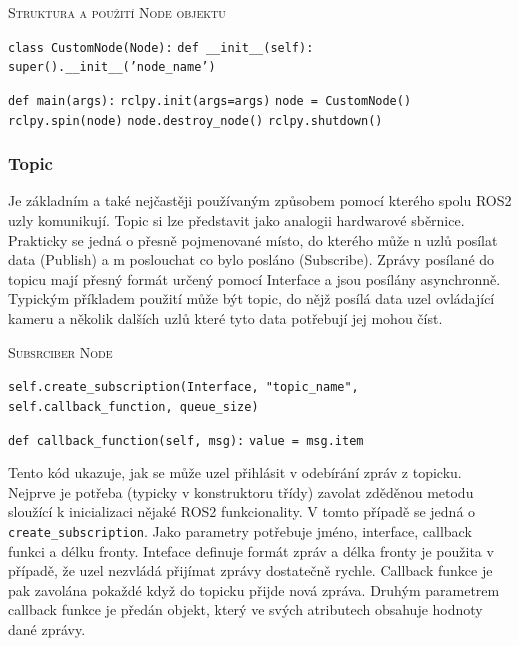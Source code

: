 \begin{algorithm}[h!]
	\label{}
	\caption{\textsc{Struktura a použití Node objektu}}
	
	\DontPrintSemicolon
	\SetAlgoNoLine
	\SetNlSty{}{}{:}
	\SetNlSkip{-1.1em}
	
	\BlankLine \Indp\Indpp
	
	\texttt{class CustomNode(Node):}\;
	\Indp\Indp
	\texttt{def \_\_init\_\_(self):}\;
	\Indp\Indp
	\texttt{super().\_\_init\_\_('node\_name')}\;
	\Indm\Indm\Indm\Indm
	
	\BlankLine
	
	\texttt{def main(args):}\;
	\Indp\Indp
	\texttt{rclpy.init(args=args)}\;
	\texttt{node = CustomNode()}\;
	\texttt{rclpy.spin(node)}\;
	\texttt{node.destroy\_node()}\;
	\texttt{rclpy.shutdown()}\;
\end{algorithm}


\subsubsection*{Topic}
Je základním a také nejčastěji používaným způsobem pomocí kterého spolu ROS2 uzly komunikují. Topic si lze představit jako analogii hardwarové sběrnice. Prakticky se jedná o přesně pojmenované místo, do kterého může n uzlů posílat data (Publish) a m poslouchat co bylo posláno (Subscribe). Zprávy posílané do topicu mají přesný formát určený pomocí Interface a jsou posílány asynchronně. Typickým příkladem použití může být topic, do nějž posílá data uzel ovládající kameru a několik dalších uzlů které tyto data potřebují jej mohou číst. \cite{ros2_introduction}

\begin{algorithm}[h!]
	\label{}
	\caption{\textsc{Subsrciber Node}}
	
	\DontPrintSemicolon
	\SetAlgoNoLine
	\SetAlgoNlRelativeSize{-1}
	\SetNlSty{}{}{:}
	\SetNlSkip{-1.1em}
	
	\BlankLine \Indp\Indpp
	\texttt{self.create\_subscription(Interface, "topic\_name", self.callback\_function, queue\_size)}\;
	
	\BlankLine
	\texttt{def callback\_function(self, msg):}\;
	\Indp\Indp
	\texttt{value = msg.item}\;
\end{algorithm}
Tento kód ukazuje, jak se může uzel přihlásit v odebírání zpráv z topicku. Nejprve je potřeba (typicky v konstruktoru třídy) zavolat zděděnou metodu sloužící k inicializaci nějaké ROS2 funkcionality. V tomto případě se jedná o \verb|create_subscription|. Jako parametry potřebuje jméno, interface, callback funkci a délku fronty. Inteface definuje formát zpráv a délka fronty je použita v případě, že uzel nezvládá přijímat zprávy dostatečně rychle. Callback funkce je pak zavolána pokaždé když do topicku přijde nová zpráva. Druhým parametrem callback funkce je předán objekt, který ve svých atributech obsahuje hodnoty dané zprávy.

